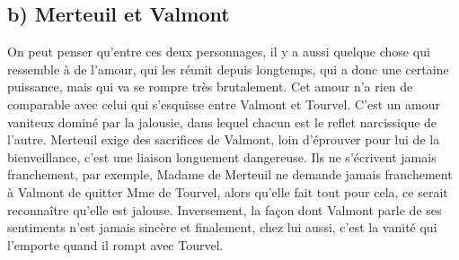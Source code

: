 \documentclass[12pt]{article}
\begin{document}
\subsection*{b) Merteuil et Valmont}
On peut penser qu'entre ces deux personnages, il y a aussi quelque chose qui ressemble à de l'amour, qui les réunit depuis longtemps, qui a donc une certaine puissance, mais qui va se rompre très brutalement.
Cet amour n'a rien de comparable avec celui qui s'esquisse entre Valmont et Tourvel.
C'est un amour vaniteux dominé par la jalousie, dans lequel chacun est le reflet narcissique de l'autre.
Merteuil exige des sacrifices de Valmont, loin d'éprouver pour lui de la bienveillance, c'est une liaison longuement dangereuse.
Ils ne s'écrivent jamais franchement, par exemple, Madame de Merteuil ne demande jamais franchement à Valmont de quitter Mme de Tourvel, alors qu'elle fait tout pour cela, ce serait reconnaître qu'elle est jalouse.
Inversement, la façon dont Valmont parle de ses sentiments n'est jamais sincère et finalement, chez lui aussi, c'est la vanité qui l'emporte quand il rompt avec Tourvel.
\end{document}
